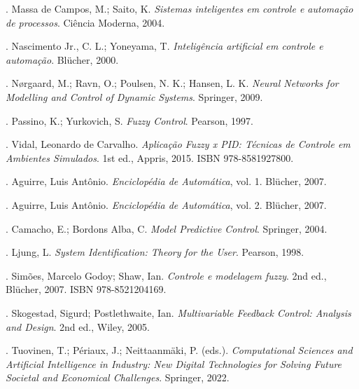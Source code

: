 \documentclass[11pt,a4paper]{article}
\begin{document}
. Massa de Campos, M.; Saito, K. \emph{Sistemas inteligentes em controle e automação de processos}. Ciência Moderna, 2004.\par\smallskip

. Nascimento Jr., C. L.; Yoneyama, T. \emph{Inteligência artificial em controle e automação}. Blücher, 2000.\par\smallskip

. Nørgaard, M.; Ravn, O.; Poulsen, N. K.; Hansen, L. K. \emph{Neural Networks for Modelling and Control of Dynamic Systems}. Springer, 2009.\par\smallskip

. Passino, K.; Yurkovich, S. \emph{Fuzzy Control}. Pearson, 1997.\par\smallskip

. Vidal, Leonardo de Carvalho. \emph{Aplicação Fuzzy x PID: Técnicas de Controle em Ambientes Simulados}. 1st ed., Appris, 2015. ISBN 978-8581927800.\par\smallskip

. Aguirre, Luis Antônio. \emph{Enciclopédia de Automática}, vol. 1. Blücher, 2007.\par\smallskip

. Aguirre, Luis Antônio. \emph{Enciclopédia de Automática}, vol. 2. Blücher, 2007.\par\smallskip

. Camacho, E.; Bordons Alba, C. \emph{Model Predictive Control}. Springer, 2004.\par\smallskip

. Ljung, L. \emph{System Identification: Theory for the User}. Pearson, 1998.\par\smallskip

. Simões, Marcelo Godoy; Shaw, Ian. \emph{Controle e modelagem fuzzy}. 2nd ed., Blücher, 2007. ISBN 978-8521204169.\par\smallskip

. Skogestad, Sigurd; Postlethwaite, Ian. \emph{Multivariable Feedback Control: Analysis and Design}. 2nd ed., Wiley, 2005.\par\smallskip

. Tuovinen, T.; Périaux, J.; Neittaanmäki, P. (eds.). \emph{Computational Sciences and Artificial Intelligence in Industry: New Digital Technologies for Solving Future Societal and Economical Challenges}. Springer, 2022.\par\smallskip
\end{document}
